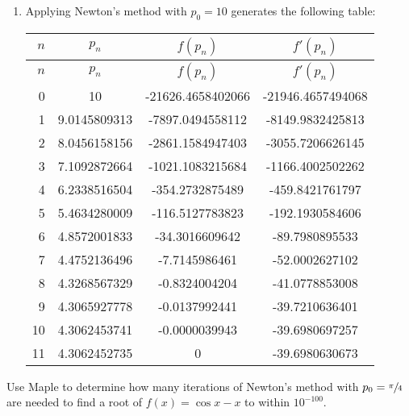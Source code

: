 \documentclass[../../../../Assignments]{subfiles}
\begin{document}
\begin{solution}
\begin{enumerate}[label = \alph*)]
        \item Applying Newton's method with \(p_0 = 10\) generates the following
            table:

            \begin{longtable}{r S[table-format=2.10] S[table-format=-5.10] S[table-format=-5.10]}
                \toprule
                \(n\)  &    {\(p_n\)}    &     {\(f(p_n)\)}    &    {\(f'(p_n)\)}    \\
                \midrule
                \endfirsthead
                \(n\)  &    {\(p_n\)}    &     {\(f(p_n)\)}    &    {\(f'(p_n)\)}    \\
                \midrule
                  &  10             &  -21626.4658402066  &  -21946.4657494068  \\
                    1  &   9.0145809313  &   -7897.0494558112  &   -8149.9832425813  \\
                    2  &   8.0456158156  &   -2861.1584947403  &   -3055.7206626145  \\
                    3  &   7.1092872664  &   -1021.1083215684  &   -1166.4002502262  \\
                    4  &   6.2338516504  &    -354.2732875489  &    -459.8421761797  \\
                    5  &   5.4634280009  &    -116.5127783823  &    -192.1930584606  \\
                    6  &   4.8572001833  &     -34.3016609642  &     -89.7980895533  \\
                    7  &   4.4752136496  &      -7.7145986461  &     -52.0002627102  \\
                    8  &   4.3268567329  &      -0.8324004204  &     -41.0778853008  \\
                    9  &   4.3065927778  &      -0.0137992441  &     -39.7210636401  \\
                   10  &   4.3062453741  &      -0.0000039943  &     -39.6980697257  \\
                   11  &   4.3062452735  &       0             &     -39.6980630673  \\
                \bottomrule
            \end{longtable}
    \end{enumerate}
\end{solution}

\begin{exercise}
    Use Maple to determine how many iterations of Newton's method with \(p_0 =
    \sfrac{\pi}{4}\) are needed to find a root of \(f(x) = \cos{x} - x\) to
    within \(10^{-100}\).
\end{exercise}
\end{document}

